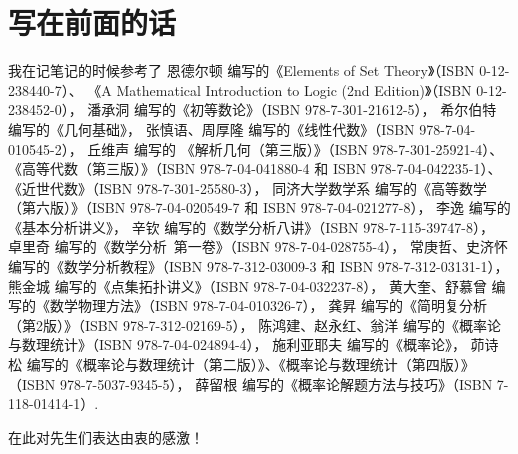 \chapter*{写在前面的话}
我在记笔记的时候参考了
恩德尔顿 编写的《Elements of Set Theory》（ISBN 0-12-238440-7）、
《A Mathematical Introduction to Logic (2nd Edition)》（ISBN 0-12-238452-0），
潘承洞 编写的《初等数论》（ISBN 978-7-301-21612-5），
希尔伯特 编写的《几何基础》，
张慎语、周厚隆 编写的《线性代数》（ISBN 978-7-04-010545-2），
丘维声 编写的
《解析几何（第三版）》（ISBN 978-7-301-25921-4）、
《高等代数（第三版）》（ISBN 978-7-04-041880-4 和 ISBN 978-7-04-042235-1）、
《近世代数》（ISBN 978-7-301-25580-3），
同济大学数学系 编写的《高等数学（第六版）》（ISBN 978-7-04-020549-7 和 ISBN 978-7-04-021277-8），
李逸 编写的《基本分析讲义》，
辛钦 编写的《数学分析八讲》（ISBN 978-7-115-39747-8），
卓里奇 编写的《数学分析\ 第一卷》（ISBN 978-7-04-028755-4），
常庚哲、史济怀 编写的《数学分析教程》（ISBN 978-7-312-03009-3 和 ISBN 978-7-312-03131-1），
熊金城 编写的《点集拓扑讲义》（ISBN 978-7-04-032237-8），
黄大奎、舒慕曾 编写的《数学物理方法》（ISBN 978-7-04-010326-7），
龚昇 编写的《简明复分析（第2版）》（ISBN 978-7-312-02169-5），
陈鸿建、赵永红、翁洋 编写的《概率论与数理统计》（ISBN 978-7-04-024894-4），
施利亚耶夫 编写的《概率论》，
茆诗松 编写的《概率论与数理统计（第二版）》、《概率论与数理统计（第四版）》（ISBN 978-7-5037-9345-5），
薛留根 编写的《概率论解题方法与技巧》（ISBN 7-118-01414-1）.

在此对先生们表达由衷的感激！
